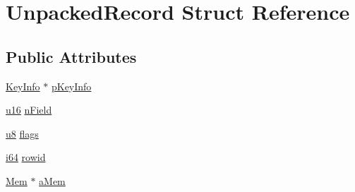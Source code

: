 \hypertarget{struct_unpacked_record}{\section{Unpacked\-Record Struct Reference}
\label{struct_unpacked_record}
}
\subsection*{Public Attributes}
\begin{DoxyCompactItemize}
\item 
\hyperlink{struct_key_info}{Key\-Info} $\ast$ \hyperlink{struct_unpacked_record_aeb43e7a1e300857cab2cbe98eacd575b}{p\-Key\-Info}
\item 
\hyperlink{sqlite3_8c_a20f2299e322dcbde37cb07b16910b843}{u16} \hyperlink{struct_unpacked_record_a2c5062735cdbc5039679d255cc900668}{n\-Field}
\item 
\hyperlink{sqlite3_8c_a74a0f6424ae628af25f23f0a35f6ead3}{u8} \hyperlink{struct_unpacked_record_ab24dd1a413192bae21ec613ca3b239a1}{flags}
\item 
\hyperlink{sqlite3_8c_a2a0f0f4ae7001eb54351f77ea1cdbcfd}{i64} \hyperlink{struct_unpacked_record_a5ec2064b28fcf43b46bf92a515e9203e}{rowid}
\item 
\hyperlink{struct_mem}{Mem} $\ast$ \hyperlink{struct_unpacked_record_a3299c322ceb8b758dacc59701021ae9f}{a\-Mem}
\end{DoxyCompactItemize}


